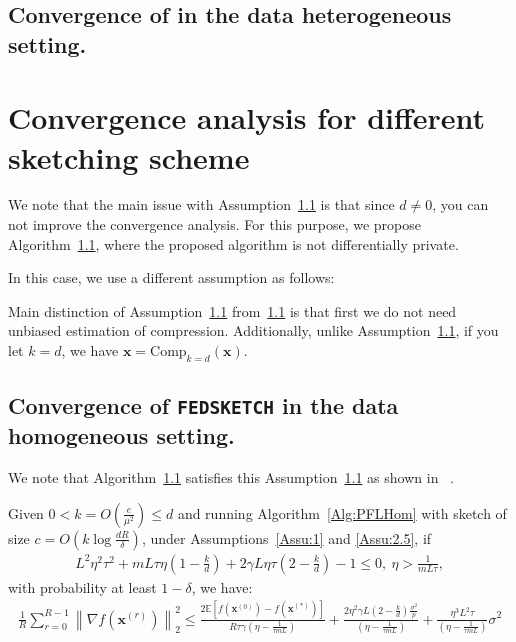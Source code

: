 

\subsection{Convergence of  \texttt{} in the data heterogeneous setting.} 
\section{Convergence analysis for different sketching scheme}
We note that the main issue with Assumption~\ref{} is that since $d\neq 0$, you can not improve the convergence analysis. For this purpose, we propose Algorithm~\ref{}, where the proposed algorithm is not differentially private.

In this case, we use a different assumption as follows:

\begin{remark}
Main distinction of Assumption~\ref{} from~\ref{} is that first we do not need unbiased estimation of compression. Additionally, unlike Assumption~\ref{}, if you let $k=d$, we have $\boldsymbol{x}=\text{Comp}_{k=d}(\boldsymbol{x})$.    
\end{remark}




\subsection{Convergence of \texttt{FEDSKETCH} in the data homogeneous setting.} 


We note that Algorithm~\ref{} satisfies this Assumption~\ref{} as shown in ~\cite{ivkin2019communication}.

\begin{theorem}
Given $0<k=O\left(\frac{e}{\mu^2}\right)\leq d$
and running Algorithm~\ref{Alg:PFLHom} with sketch of size $c=O\left(k\log \frac{d R}{\delta}\right)$,  under Assumptions~\ref{Assu:1} and \ref{Assu:2.5}, if 
\begin{align}
       L^2\eta^2\tau^2+mL\tau\eta\left(1-\frac{k}{d}\right)+2\gamma L\eta\tau\left(2-\frac{k}{d}\right)-1\leq 0,\:\eta> \frac{1}{mL\tau},\label{eq:cnd-lrs-h-ii} 
\end{align}
with probability at least $1-\delta$, we have:
\begin{align}
    \frac{1}{R}\sum_{r=0}^{R-1}\left\|\nabla f({\boldsymbol{x}}^{(r)})\right\|_2^2\leq \frac{2 \mathbb{E}\left[f({\boldsymbol{x}}^{(0)})-f({\boldsymbol{x}}^{(*)})\right]}{R\tau \gamma \left({\eta}-\frac{1}{\tau mL}\right)}+\frac{2\eta^2\gamma L\left(2-\frac{k}{d}\right)\frac{\sigma^2}{p}}{ \left({\eta}-\frac{1}{\tau mL}\right)}+\frac{\eta^3L^2\tau}{\left({\eta}-\frac{1}{\tau mL}\right)}\sigma^2 
\end{align}
\end{theorem}
\begin{remark}[$k=d$]
\end{remark}

